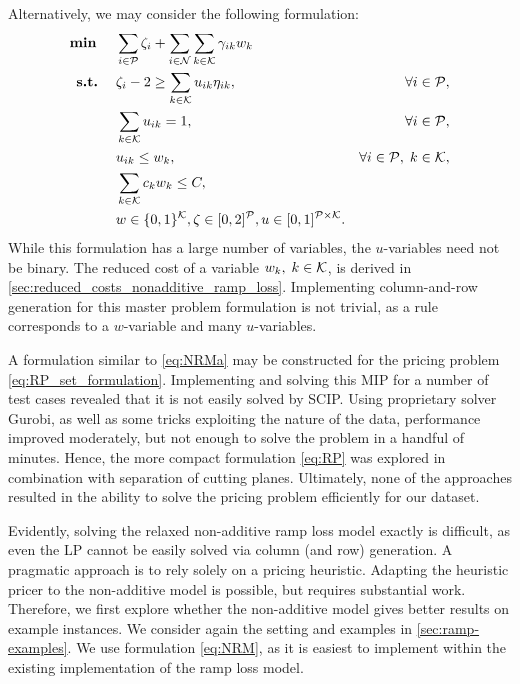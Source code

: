 Alternatively, we may consider the following formulation:
\begin{subequations}
    \label{eq:NRMa}
    \begin{align}
        \mathbf{\text{\textbf{min }}} \quad & \sum_{i \in \mathcal{P}} \zeta_i + \sum_{i \in \mathcal{N}} \sum_{k \in \mathcal{K}} \gamma_{ik} w_k \label{eq:NRMa-obj} \\
        \mathbf{\text{\textbf{s.t.}}\;} \quad & \zeta_i - 2 \geq \sum_{k \in \mathcal{K}} u_{ik}\eta_{ik}, & \forall i \in \mathcal{P}, \label{eq:NRMa-misP} \\
        & \sum_{k \in \mathcal{K}} u_{ik} = 1, & \forall i \in \mathcal{P}, \label{eq:NRMa-misP2} \\
        & u_{ik} \leq w_k, & \forall i \in \mathcal{P}, \; k \in \mathcal{K}, \label{eq:NRMa-misP3} \\
        & \sum_{k \in \mathcal{K}} c_k w_k \leq C, & \label{eq:NRMa-complex} \\
        & w \in \{0, 1\}^{\mathcal{K}}, \zeta \in [0,2]^{\mathcal{P}}, u \in [0,1]^{\mathcal{P} \times \mathcal{K}}. \label{eq:NRMa-vars}
    \end{align}
\end{subequations}
While this formulation has a large number of variables, the $u$-variables need not be binary.
The reduced cost of a variable $w_k,\; k \in \mathcal{K}$, is derived in \autoref{sec:reduced_costs_nonadditive_ramp_loss}.
Implementing column-and-row generation for this master problem formulation is not trivial,
as a rule corresponds to a $w$-variable and many $u$-variables.

\begin{note}
    A formulation similar to \eqref{eq:NRMa} may be constructed for the pricing problem \eqref{eq:RP_set_formulation}.
    Implementing and solving this MIP for a number of test cases revealed that it is not easily solved by SCIP.\@
    Using proprietary solver Gurobi, as well as some tricks exploiting the nature of the data,
    performance improved moderately, but not enough to solve the problem in a handful of minutes.
    Hence, the more compact formulation \eqref{eq:RP} was explored in combination with separation of cutting planes.
    Ultimately, none of the approaches resulted in the ability to solve the pricing problem efficiently for our dataset.
\end{note}

Evidently, solving the relaxed non-additive ramp loss model exactly is difficult,
as even the LP cannot be easily solved via column (and row) generation.
A pragmatic approach is to rely solely on a pricing heuristic.
Adapting the heuristic pricer to the non-additive model is possible, but requires substantial work.
Therefore, we first explore whether the non-additive model gives better results on example instances.
We consider again the setting and examples in \autoref{sec:ramp-examples}.
We use formulation \eqref{eq:NRM}, as it is easiest to implement within the existing implementation of the ramp loss model.

